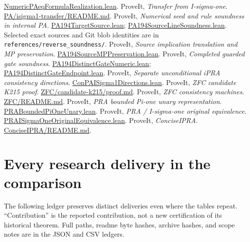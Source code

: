 \documentclass[11pt,a4paper]{article}
\newcommand{\file}[1]{\texttt{\nolinkurl{#1}}}
\newcommand{\repo}[2]{\href{https://github.com/VladimirReshetnikov/ProveIt/blob/1c9524d8bf2e0a27b9a16ff622359927f536e663/#1}{#2}}
\begin{document}
\begin{thebibliography}{30}
\repo{Computability/BusyBeaver/Research/PA/jamesyc-upstream/pa196/PA196/Arithmetic/Transport/NumericPAeqFormulaRealization.lean}{NumericPAeqFormulaRealization.lean}.
 ProveIt, \emph{Transfer from I-sigma-one}.
\repo{Computability/BusyBeaver/Research/PA/isigma1-transfer/README.md}{PA/isigma1-transfer/README.md}.
 ProveIt, \emph{Numerical seed and rule soundness in internal PA}.
\repo{Computability/BusyBeaver/Research/PA/pa194-target-source/PA194TargetSource.lean}{PA194TargetSource.lean};
\repo{Computability/BusyBeaver/Research/PA/pa195-calibration/PA194SourceLineSoundness.lean}{PA194SourceLineSoundness.lean}.
Selected exact sources and Git blob identities are in
\file{references/reverse_soundness/}.
 ProveIt, \emph{Source implication translation and MP preservation}.
\repo{Computability/BusyBeaver/Research/PA/pa195-calibration/PA194SourceMPPreservation.lean}{PA194SourceMPPreservation.lean}.
 ProveIt, \emph{Completed guarded gate soundness}.
\repo{Computability/BusyBeaver/Research/PA/pa194-distinct-gate-sound/PA194DistinctGateNumeric.lean}{PA194DistinctGateNumeric.lean};
\repo{Computability/BusyBeaver/Research/PA/pa194-distinct-gate-endpoint/PA194DistinctGateEndpoint.lean}{PA194DistinctGateEndpoint.lean}.
 ProveIt, \emph{Separate unconditional iPRA consistency directions}.
\repo{Computability/BusyBeaver/Research/PA/isigma1-machine/ConPAISigma1Directions.lean}{ConPAISigma1Directions.lean}.
 ProveIt, \emph{ZFC candidate K215 proof}.
\repo{Computability/BusyBeaver/Research/ZFC/candidate-k215/proof.md}{ZFC/candidate-k215/proof.md}.
 ProveIt, \emph{ZFC consistency machines}.
\repo{Computability/BusyBeaver/Research/ZFC/README.md}{ZFC/README.md}.
 ProveIt, \emph{PRA bounded Pi-one unary representation}.
\repo{Computability/DiophantineConsistency/Lean/DiophantineConsistency/PRABoundedPiOneUnary.lean}{PRABoundedPiOneUnary.lean}.
 ProveIt, \emph{PRA / I-sigma-one original equivalence}.
\repo{Computability/DiophantineConsistency/Lean/DiophantineConsistency/PRAISigmaOneOriginalEquivalence.lean}{PRAISigmaOneOriginalEquivalence.lean}.
 ProveIt, \emph{ConciseIPRA}.
\repo{Logic/PrimitiveRecursiveArithmetic/ConciseIPRA/README.md}{ConciseIPRA/README.md}.
\end{thebibliography}

\clearpage\appendix
\section{Every research delivery in the comparison}
\label{app:deliveries}
The following ledger preserves distinct deliveries even where the
tables repeat. ``Contribution'' is the reported contribution, not a
new certification of its historical theorem. Full paths, readme byte
hashes, archive hashes, and scope notes are in the JSON and CSV ledgers.

\end{document}
